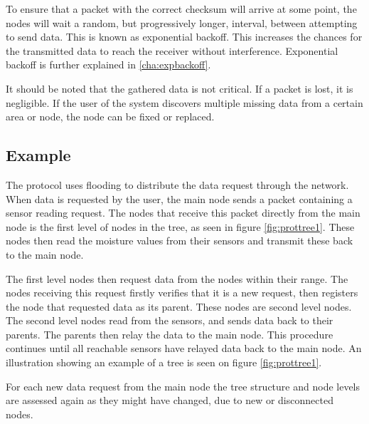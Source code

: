 To ensure that a packet with the correct checksum will arrive at some point, the nodes will wait a random, but progressively longer, interval, between attempting to send data. This is known as exponential backoff. This increases the chances for the transmitted data to reach the receiver without interference. Exponential backoff is further explained in \ref{cha:expbackoff}.

It should be noted that the gathered data is not critical. If a packet is lost, it is negligible. If the user of the system discovers multiple missing data from a certain area or node, the node can be fixed or replaced.


\subsection*{Example}
The protocol uses flooding to distribute the data request through the network. 
When data is requested by the user, the main node sends a packet containing a sensor reading request. 
The nodes that receive this packet directly from the main node is the first level of nodes in the tree, as seen in figure \ref{fig:prottree1}. 
These nodes then read the moisture values from their sensors and transmit these back to the main node. 

The first level nodes then request data from the nodes within their range. 
The nodes receiving this request firstly verifies that it is a new request, then registers the node that requested data as its parent. 
These nodes are second level nodes. The second level nodes read from the sensors, and sends data back to their parents. The parents then relay the data to the main node. 
This procedure continues until all reachable sensors have relayed data back to the main node.
An illustration showing an example of a tree is seen on figure \ref{fig:prottree1}.

For each new data request from the main node the tree structure and node levels are assessed again as they might have changed, due to new or disconnected nodes.

